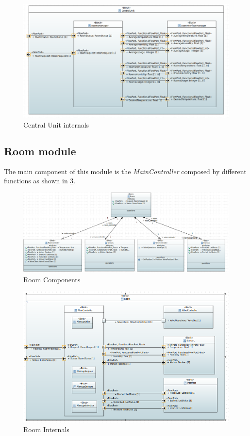 \begin{figure}[H]
	\centering
	\includegraphics[width=12cm,keepaspectratio]{img/sysml/CentralUnitInternals}
	\caption{Central Unit internals}
	\label{fig:CentralUnit_internals}
\end{figure}

\subsection{Room module}
The main component of this module is the \textit{MainController} composed by different functions as shown in \ref{fig:RoomInternals}.
\begin{figure}[H]
	\centering
	\includegraphics[width=13cm,keepaspectratio]{img/sysml/RoomComponents}
	\caption{Room Components}
	\label{fig:RoomComponents}
\end{figure}

\begin{figure}[H]
	\centering
	\includegraphics[width=13cm,keepaspectratio]{img/sysml/RoomInternals}
	\caption{Room Internals}
	\label{fig:RoomInternals}
\end{figure}

